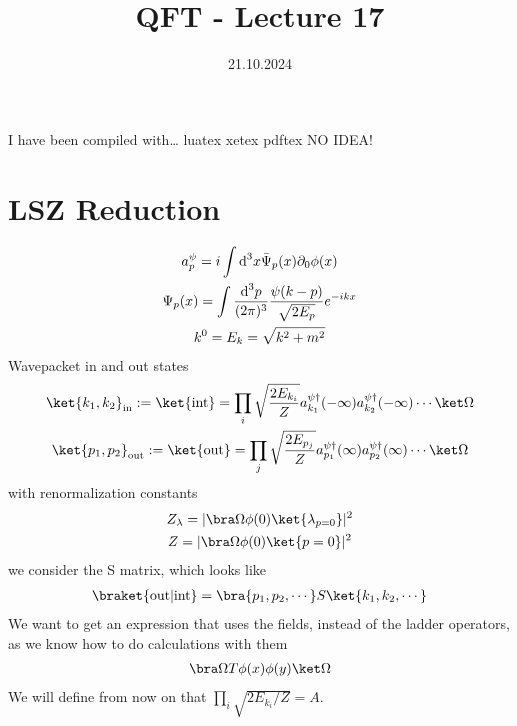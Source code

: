 \documentclass[]{scrartcl}
\title{QFT - Lecture 17}
\author{}
\date{21.10.2024}
\begin{document}
I have been compiled with\dots{\ttfamily
\ifluatex
    luatex
\else\ifxetex
    xetex
\else\ifpdftex
    pdftex
\else
    NO IDEA!
\fi\fi\fi}


\maketitle
\newpage
\tableofcontents
\newpage

\section{LSZ Reduction} 

\begin{gather}
	a_p^\psi = i\int \text d^3x \bar\Psi_p(x) \partial_0 \phi(x)\\
	\Psi_p(x) = \int\frac{\text d^3p}{(2\pi)^3}\frac{\psi(k-p)}{\sqrt{2E_p}}e^{-ikx}\\
	k^0 = E_k = \sqrt{k^2 + m^2}
\end{gather}
Wavepacket in and out states
\begin{gather}
	\ket{k_1,k_2}_{\text{in}} := \ket{\text{int}}= \prod_i \sqrt{\frac{2E_{k_i}}{Z}}a_{k_1}^{\psi\dagger}(-\infty)a_{k_2}^{\psi\dagger}(-\infty)\cdots\ket\Omega\\
	\ket{p_1,p_2}_\text{out} := \ket{\text{out}} = \prod_j \sqrt\frac{2E_{p_j}}{Z} a_{p_1}^{\psi\dagger}(\infty)a_{p_2}^{\psi\dagger}(\infty)\cdots\ket\Omega
\end{gather}
with renormalization constants
\begin{gather}
	Z_\lambda = |\bra\Omega \phi(0) \ket{\lambda_{p=0}}|^2\\
	Z = |\bra\Omega \phi(0) \ket{p=0}|^2
\end{gather}
we consider the S matrix, which looks like
\begin{gather}
	\braket{\text{out}|\text{int}} = \bra{p_1,p_2,\cdots}S\ket{k_1,k_2,\cdots}
\end{gather}
We want to get an expression that uses the fields, instead of the ladder operators, as we know how to do calculations with them
\begin{gather}
	\bra\Omega T\phi(x)\phi(y) \ket\Omega
\end{gather}
We will define from now on that $\prod_i \sqrt{2E_{k_i}/Z} = A$.
\end{document}

